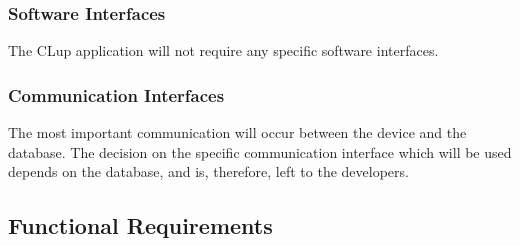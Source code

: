 \subsubsection{Software Interfaces}
\hspace{\parindent}The CLup application will not require any specific software interfaces.
\subsubsection{Communication Interfaces}
\hspace{\parindent}The most important communication will occur between the device and the database. The decision on the specific communication interface which will be used depends on the database, and is, therefore, left to the developers.

\newpage
\subsection{Functional Requirements}
